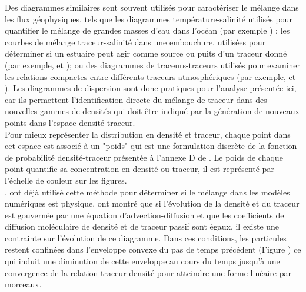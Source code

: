 \documentclass[a4paper,12pt]{article}
\begin{document}
        \newline
        Des diagrammes similaires sont souvent utilisés pour caractériser le mélange dans les flux géophysiques, tels que les diagrammes température-salinité utilisés pour quantifier le mélange de grandes masses d'eau dans l'océan (par exemple \citep{tomczak_multi-parameter_1981}) ; les courbes de mélange traceur-salinité dans une embouchure, utilisées pour déterminer si un estuaire peut agir comme source ou puits d'un traceur donné (par exemple, \citep{loder_dynamics_1981} et \cite{officer_dynamics_1981}); ou des diagrammes de traceurs-traceurs utilisés pour examiner les relations compactes entre différents traceurs atmosphériques (par exemple, \cite{tilmes_development_2006} et \cite{plumb_tracer_2007}). Les diagrammes de dispersion sont donc pratiques pour l'analyse présentée ici, car ils permettent l'identification directe du mélange de traceur dans des nouvelles gammes de densités
        qui doit être indiqué par la génération de nouveaux points dans l'espace densité-traceur.\\
        Pour mieux représenter la distribution en densité et traceur, chaque point dans cet espace est associé à un "poids" qui est une formulation discrète de la fonction de probabilité densité-traceur présentée à l'annexe D de \cite{plumb_tracer_2007}. Le poids de chaque point quantifie sa concentration en densité ou traceur, il est représenté par l'échelle de couleur sur les figures. \\
        \newline
        \cite{plumb_tracer_2007}, \cite{lauritzen_evaluating_2012} ont déjà utilisé cette méthode pour déterminer si le mélange dans les modèles numériques est physique. \cite{penney_diapycnal_2020} ont montré que si l'évolution de la densité et du traceur est gouvernée par une équation d'advection-diffusion et que les coefficients de diffusion moléculaire de densité et de traceur passif sont égaux, il existe une contrainte sur l'évolution de ce diagramme. Dans ces conditions, les particules restent confinées dans l'enveloppe convexe du pas de temps précédent (Figure ) ce qui induit une diminution de cette enveloppe au cours du temps jusqu'à une convergence de la relation traceur densité pour atteindre une forme linéaire par morceaux.
        
    
\end{document}
